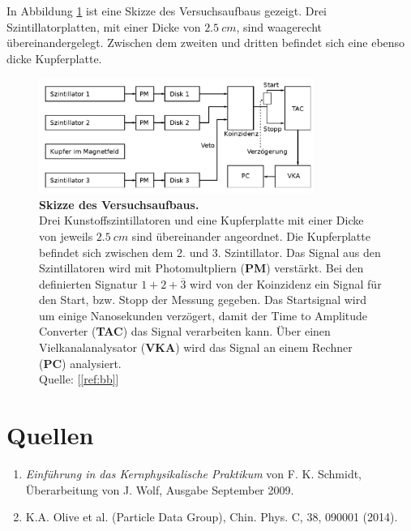 \documentclass[a4paper,ngerman]{scrartcl}
\begin{document}
In Abbildung \ref{fig:aufbau_skizze} ist eine Skizze des Versuchsaufbaus gezeigt. Drei Szintillatorplatten, mit einer Dicke von $\SI{2.5}{cm}$, sind waagerecht übereinandergelegt. Zwischen dem zweiten und dritten befindet sich eine ebenso dicke Kupferplatte. 



\begin{figure}[tb!]
  \centering
  \includegraphics[width=0.8\textwidth]{abbildungen/aufbau_skizze.png}
  \caption{\textbf{Skizze des Versuchsaufbaus.} 
  \\ 
  Drei Kunstoffszintillatoren und eine Kupferplatte mit einer Dicke von jeweils $\SI{2.5}{cm}$ sind übereinander angeordnet. Die Kupferplatte befindet sich zwischen dem 2. und 3. Szintillator. Das Signal aus den Szintillatoren wird mit Photomultpliern (\textbf{PM}) verstärkt. Bei den definierten Signatur $1 + 2 + \overline{3}$ wird von der Koinzidenz ein Signal für den Start, bzw. Stopp der Messung gegeben. Das Startsignal wird um einige Nanosekunden verzögert, damit der Time to Amplitude Converter (\textbf{TAC}) das Signal verarbeiten kann. Über einen Vielkanalanalysator (\textbf{VKA}) wird das Signal an einem Rechner (\textbf{PC}) analysiert.
  \\Quelle: [\ref{ref:bb}]}
  \label{fig:aufbau_skizze}
\end{figure}





\clearpage
\section{Quellen}
\begin{enumerate}
\item \emph{Einführung in das Kernphysikalische Praktikum} von F. K. Schmidt, 
  Überarbeitung von J. Wolf, Ausgabe September 2009. \label{ref:bb}
\item K.A. Olive et al. (Particle Data Group), Chin. Phys. C, 38, 090001 (2014). \label{ref:pdg14}
\end{enumerate}
\end{document}
